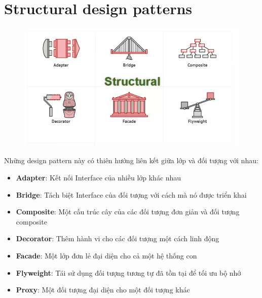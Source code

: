 \section{Structural design patterns}
\begin{figure}[!htb]
    \centering
    \includegraphics[width=\textwidth]{fig/Introduction/structural.png}
\end{figure}
Những design pattern này có thiên hướng liên kết giữa lớp và đối tượng với nhau:
\begin{itemize}
    \item \textbf{Adapter}: Kết nối Interface của nhiều lớp khác nhau
    \item \textbf{Bridge}: Tách biệt Interface của đối tượng với cách mà nó được triển khai
    \item \textbf{Composite}: Một cấu trúc cây của các đối tượng đơn giản và đối tượng composite
    \item \textbf{Decorator}: Thêm hành vi cho các đối tượng một cách linh động
    \item \textbf{Facade}: Một lớp đơn lẻ đại diện cho cả một hệ thống con
    \item \textbf{Flyweight}: Tái sử dụng đối tượng tương tự đã tồn tại để tối ưu bộ nhớ
    \item \textbf{Proxy}: Một đối tượng đại diện cho một đối tượng khác
\end{itemize}


